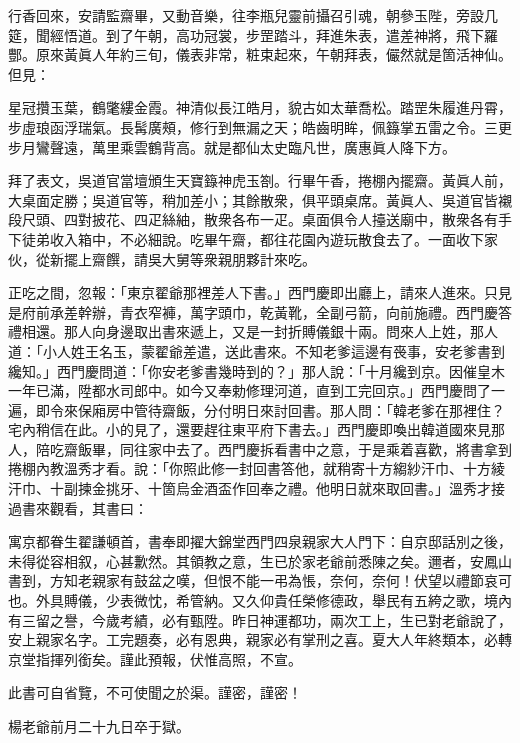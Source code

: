行香回來，安請監齋畢，又動音樂，往李瓶兒靈前攝召引魂，朝參玉陛，旁設几筵，聞經悟道。到了午朝，高功冠裳，步罡踏斗，拜進朱表，遣差神將，飛下羅酆。原來黃眞人年約三旬，儀表非常，粧束起來，午朝拜表，儼然就是箇活神仙。但見：

\begin{myquote} 
星冠攢玉葉，鶴氅縷金霞。神清似長江皓月，貌古如太華喬松。踏罡朱履進丹霄，步虛琅函浮瑞氣。長髯廣頰，修行到無漏之天；皓齒明眸，佩籙掌五雷之令。三更步月鸞聲遠，萬里乘雲鶴背高。就是都仙太史臨凡世，廣惠眞人降下方。
\end{myquote} 

拜了表文，吳道官當壇頒生天寶籙神虎玉劄。行畢午香，捲棚內擺齋。黃眞人前，大桌面定勝；吳道官等，稍加差小；其餘散衆，俱平頭桌席。黃眞人、吳道官皆襯段尺頭、四對披花、四疋絲紬，散衆各布一疋。桌面俱令人擡送廟中，散衆各有手下徒弟收入箱中，不必細說。吃畢午齋，都往花園內遊玩散食去了。一面收下家伙，從新擺上齋饌，請吳大舅等衆親朋夥計來吃。

正吃之間，忽報：「東京翟爺那裡差人下書。」西門慶即出廳上，請來人進來。只見是府前承差幹辦，青衣窄褲，萬字頭巾，乾黃靴，全副弓箭，向前施禮。西門慶答禮相還。那人向身邊取出書來遞上，又是一封折賻儀銀十兩。問來人上姓，那人道：「小人姓王名玉，蒙翟爺差遣，送此書來。不知老爹這邊有䘮事，安老爹書到纔知。」西門慶問道：「你安老爹書幾時到的？」那人說：「十月纔到京。因催皇木一年已滿，陞都水司郎中。如今又奉勅修理河道，直到工完回京。」西門慶問了一遍，即令來保廂房中管待齋飯，分付明日來討回書。那人問：「韓老爹在那裡住？宅內稍信在此。小的見了，還要趕往東平府下書去。」西門慶即喚出韓道國來見那人，陪吃齋飯畢，同往家中去了。西門慶拆看書中之意，于是乘着喜歡，將書拿到捲棚內教溫秀才看。{}說：「你照此修一封回書答他，就稍寄十方縐紗汗巾、十方綾汗巾、十副揀金挑牙、十箇烏金酒盃作回奉之禮。他明日就來取回書。」溫秀才接過書來觀看，其書曰：

\begin{myquote}[\markfont]
寓京都眷生翟謙頓首，書奉即擢大錦堂西門四泉親家大人門下：自京邸話別之後，未得從容相叙，心甚歉然。其領教之意，生已於家老爺前悉陳之矣。邇者，安鳳山書到，方知老親家有鼓盆之嘆，但恨不能一弔為悵，奈何，奈何！伏望以禮節哀可也。外具賻儀，少表微忱，希管納。又久仰貴任榮修德政，舉民有五絝之歌，境內有三留之譽，今歲考績，必有甄陞。昨日神運都功，兩次工上，生已對老爺說了，安上親家名字。工完題奏，必有恩典，親家必有掌刑之喜。夏大人年終類本，必轉京堂指揮列銜矣。謹此預報，伏惟高照，不宣。

{}此書可自省覽，不可使聞之於渠。謹密，謹密！

{}

楊老爺前月二十九日卒于獄。{}

\end{myquote}

